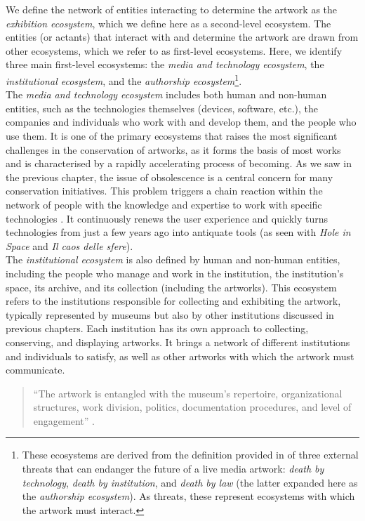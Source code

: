 We define the network of entities interacting to determine the artwork as the \textit{exhibition ecosystem}, which we define here as a second-level ecosystem. The entities (or actants) that interact with and determine the artwork are drawn from other ecosystems, which we refer to as first-level ecosystems. Here, we identify three main first-level ecosystems: the \textit{media and technology ecosystem}, the \textit{institutional ecosystem}, and the \textit{authorship ecosystem}\footnote{These ecosystems are derived from the definition provided in \cite{rinehart2014re} of three external threats that can endanger the future of a live media artwork: \textit{death by technology}, \textit{death by institution}, and \textit{death by law} (the latter expanded here as the \textit{authorship ecosystem}). As threats, these represent ecosystems with which the artwork must interact.}.\\
The \textit{media and technology ecosystem} includes both human and non-human entities, such as the technologies themselves (devices, software, etc.), the companies and individuals who work with and develop them, and the people who use them. It is one of the primary ecosystems that raises the most significant challenges in the conservation of artworks, as it forms the basis of most works and is characterised by a rapidly accelerating process of becoming. As we saw in the previous chapter, the issue of obsolescence is a central concern for many conservation initiatives. This problem triggers a chain reaction within the network of people with the knowledge and expertise to work with specific technologies \cite{laurenson2013emerging}. It continuously renews the user experience and quickly turns technologies from just a few years ago into antiquate tools (as seen with \textit{Hole in Space} and \textit{Il caos delle sfere}).\\
The \textit{institutional ecosystem} is also defined by human and non-human entities, including the people who manage and work in the institution, the institution’s space, its archive, and its collection (including the artworks). This ecosystem refers to the institutions responsible for collecting and exhibiting the artwork, typically represented by museums but also by other institutions discussed in previous chapters. Each institution has its own approach to collecting, conserving, and displaying artworks. It brings a network of different institutions and individuals to satisfy, as well as other artworks with which the artwork must communicate.
\begin{quote}
“The artwork is entangled with the museum’s repertoire, organizational structures, work division, politics, documentation procedures, and level of engagement” \cite{van2013installation}.    
\end{quote}
